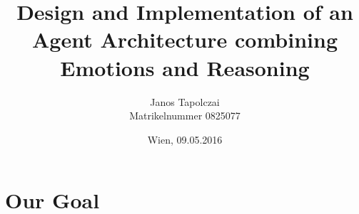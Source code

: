 \documentclass{beamer}
\title{Design and Implementation of an Agent Architecture combining Emotions and Reasoning}
\author{Janos Tapolczai\\ Matrikelnummer 0825077}
\date{Wien, 09.05.2016}
\begin{document}
   
   \begin{frame}
      \titlepage
   \end{frame}
   
   \section{Our Goal}
   

   
\end{document}
